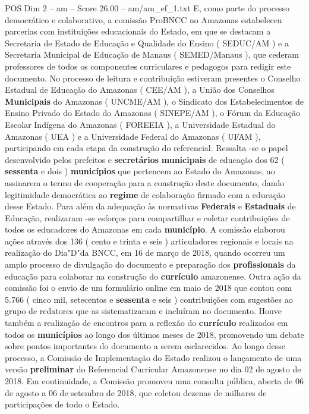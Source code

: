 \begin{textsample}{POS Dim 2 – am – Score 26.00 – am/am\_ef\_1.txt}
E, como parte do processo democrático e colaborativo, a comissão ProBNCC no Amazonas estabeleceu parcerias com instituições educacionais do Estado, em que se destacam a Secretaria de Estado de Educação e Qualidade do Ensino ( SEDUC/AM ) e a Secretaria Municipal de Educação de Manaus ( SEMED/Manaus ), que cederam professores de todos os componentes curriculares e pedagogos para redigir este documento.
No processo de leitura e contribuição estiveram presentes o Conselho Estadual de Educação do Amazonas ( CEE/AM ), a União dos Conselhos \textbf{Municipais} do Amazonas ( UNCME/AM ), o Sindicato dos Estabelecimentos de Ensino Privado do Estado do Amazonas ( SINEPE/AM ), o Fórum da Educação Escolar Indígena do Amazonas ( FOREEIA ), a Universidade Estadual do Amazonas ( UEA ) e a Universidade Federal do Amazonas ( UFAM ), participando em cada etapa da construção do referencial.
Ressalta -se o papel desenvolvido pelos prefeitos e \textbf{secretários} \textbf{municipais} de educação dos 62 ( \textbf{sessenta} e dois ) \textbf{municípios} que pertencem ao Estado do Amazonas, ao assinarem o termo de cooperação para a construção deste documento, dando legitimidade democrática ao \textbf{regime} de colaboração firmado com a educação desse Estado.
Para além da adequação às normativas \textbf{Federais} e \textbf{Estaduais} de Educação, realizaram -se esforços para compartilhar e coletar contribuições de todos os educadores do Amazonas em cada \textbf{município}.
A comissão elaborou ações através dos 136 ( cento e trinta e seis ) articuladores regionais e locais na realização do Dia"D"da BNCC, em 16 de março de 2018, quando ocorreu um amplo processo de divulgação do documento e preparação dos \textbf{profissionais} da educação para colaborar na construção do \textbf{currículo} amazonense.
Outra ação da comissão foi o envio de um formulário online em maio de 2018 que contou com 5.766 ( cinco mil, setecentos e \textbf{sessenta} e seis ) contribuições com sugestões ao grupo de redatores que as sistematizaram e incluíram no documento.
Houve também a realização de encontros para a reflexão do \textbf{currículo} realizados em todos os \textbf{municípios} ao longo dos últimos meses de 2018, promovendo um debate sobre pontos importantes do documento a serem esclarecidos.
Ao longo desse processo, a Comissão de Implementação do Estado realizou o lançamento de uma versão \textbf{preliminar} do Referencial Curricular Amazonense no dia 02 de agosto de 2018.
Em continuidade, a Comissão promoveu uma consulta pública, aberta de 06 de agosto a 06 de setembro de 2018, que coletou dezenas de milhares de participações de todo o Estado.

\end{textsample}

